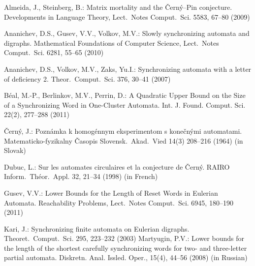 \documentclass[11pt]{llncs}
\begin{document}
\begin{thebibliography}{99}
Almeida, J., Steinberg, B.: Matrix mortality and the \v{C}ern\'{y}--Pin
conjecture. Developments in
Language Theory, Lect.\ Notes Comput.\ Sci. 5583, 67--80 (2009)

Ananichev, D.S., Gusev, V.V., Volkov, M.V.: Slowly synchronizing automata and
digraphs. Mathematical Foundations of Computer Science, Lect.\ Notes Comput.\ Sci. 6281, 55--65 (2010)

Ananichev, D.S., Volkov, M.V., Zaks, Yu.I.: Synchronizing automata
with a letter of deficiency 2. Theor.\ Comput.\ Sci. 376, 30--41 (2007)

B\'{e}al, M.-P., Berlinkov, M.V., Perrin, D.: A Quadratic Upper Bound on the Size of a Synchronizing Word 
in One-Cluster Automata. Int. J. Found. Comput. Sci. 22(2), 277--288 (2011)

\v{C}ern\'{y}, J.: Pozn\'{a}mka k homog\'{e}nnym eksperimentom s
kone\v{c}n\'{y}mi automatami. Matematicko-fyzikalny \v{C}asopis
Slovensk.\ Akad.\ Vied 14(3) 208--216 (1964) (in Slovak)

Dubuc, L.: Sur les automates circulaires et la conjecture de
\v{C}ern\'y. RAIRO Inform.\ Th\'eor.\ Appl. 32, 21--34 (1998) (in
French)
%
%
%
%

Gusev, V.V.: Lower Bounds for the Length of Reset Words in Eulerian Automata. 
Reachability Problems, Lect.\ Notes Comput.\ Sci. 6945, 180--190 (2011)

Kari, J.: Synchronizing finite automata on Eulerian digraphs.
Theoret.\ Comput.\ Sci. 295, 223--232 (2003)
%
Martyugin, P.V.: Lower bounds for the length of the shortest carefully synchronizing 
words for two- and three-letter partial automata. Diskretn. Anal. Issled. Oper., 15(4), 44--56 (2008)
(in Russian)


\end{thebibliography}
\end{document}
